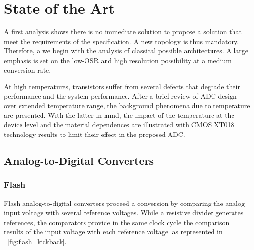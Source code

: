 
\chapter{State of the Art}
\label{sec:soa}
\ifpdf
    \graphicspath{{Chapter2/Figs/Raster/}{Chapter2/Figs/PDF/}{Chapter2/Figs/}}
\else
    \graphicspath{{Chapter2/Figs/Vector/}{Chapter2/Figs/}}
\fi

A first analysis shows there is no immediate solution to propose a solution that meet the requirements of the specification. A new topology is thus mandatory. Therefore, a we begin with the analysis of classical possible architectures. A large emphasis is set on the low-OSR and high resolution possibility at a medium conversion rate.

At high temperatures, transistors suffer from several defects that degrade their performance and the system performance. After a brief review of ADC design over extended temperature range, the background phenomena due to temperature are presented. With the latter in mind, the impact of the temperature at the device level and the material dependences are illustrated with CMOS XT018 technology results to limit their effect in the proposed ADC\@. %
\section{Analog-to-Digital Converters}
\subsection{Flash}                             %
\label{sec:flash-adc}
Flash analog-to-digital converters proceed a conversion by comparing the analog input voltage with several reference voltages. While a resistive divider generates references, the comparators provide in the same clock cycle the comparison results of the input voltage with each reference voltage, as represented in \figurename~\ref{fig:flash_kickback}. 

